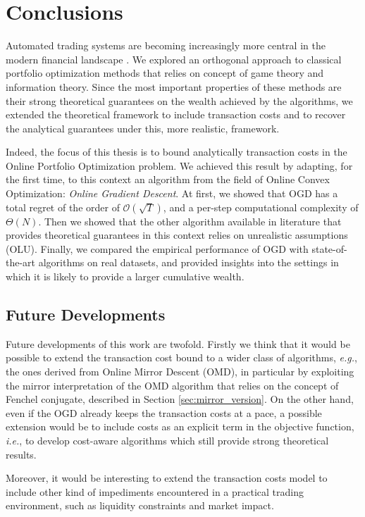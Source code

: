 \chapter{Conclusions}\label{ch:conclusions}

Automated trading systems are becoming increasingly more central in the modern financial landscape \cite{treleaven2013algorithmic}. We explored an orthogonal approach to classical portfolio optimization methods that relies on concept of game theory and information theory. Since the most important properties of these methods are their strong theoretical guarantees on the wealth achieved by the algorithms, we extended the theoretical framework to include transaction costs and to recover the analytical guarantees under this, more realistic, framework.

Indeed, the focus of this thesis is to bound analytically transaction costs in the Online Portfolio Optimization problem.
We achieved this result by adapting, for the first time, to this context an algorithm from the field of Online Convex Optimization: \emph{Online Gradient Descent}.
At first, we showed that OGD has a total regret of the order of $\mathcal{O}(\sqrt{T})$, and a per-step computational complexity of $\Theta(N)$.
Then we showed that the other algorithm available in literature that provides theoretical guarantees in this context relies on unrealistic assumptions (OLU).
Finally, we compared the empirical performance of OGD with state-of-the-art algorithms on real datasets, and provided insights into the settings in which it is likely to provide a larger cumulative wealth.

\section{Future Developments}
Future developments of this work are twofold.
Firstly we think that it would be possible to extend the transaction cost bound to a wider class of algorithms, \emph{e.g.}, the ones derived from Online Mirror Descent (OMD), in particular by exploiting the mirror interpretation of the OMD algorithm that relies on the concept of Fenchel conjugate, described in Section \ref{sec:mirror_version}.
On the other hand, even if the OGD already keeps the transaction costs at a pace, a possible extension would be to include costs as an explicit term in the objective function, \emph{i.e.}, to develop cost-aware algorithms which still provide strong theoretical results.

Moreover, it would be interesting to extend the transaction costs model to include other kind of impediments encountered in a practical trading environment, such as liquidity constraints and market impact.
